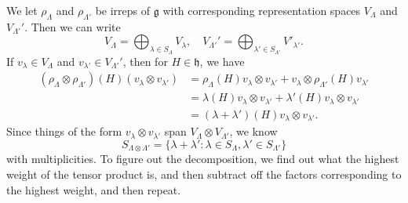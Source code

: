 \documentclass[a4paper]{article}
\begin{document}
We let $\rho_\Lambda$ and $\rho_{\Lambda'}$ be irreps of $\mathfrak{g}$ with corresponding representation spaces $V_\Lambda$ and $V_{\Lambda'}'$. Then we can write
\[
  V_\Lambda = \bigoplus_{\lambda \in S_\Lambda} V_\lambda,\quad V_{\Lambda'}' = \bigoplus_{\lambda' \in S_{\Lambda'}} V'_{\lambda'}.
\]
If $v_\lambda \in V_\Lambda$ and $v_{\lambda'} \in V_{\Lambda'}'$, then for $H \in \mathfrak{h}$, we have
\begin{align*}
  (\rho_\Lambda \otimes \rho_{\Lambda'})(H)(v_\lambda \otimes v_{\lambda'}) &= \rho_\Lambda(H)v_\lambda \otimes v_{\lambda'} + v_\lambda \otimes \rho_{\Lambda'}(H) v_{\lambda'}\\
  &= \lambda(H) v_\lambda \otimes v_{\lambda'} + \lambda'(H) v_\lambda \otimes v_{\lambda'}\\
  &= (\lambda + \lambda')(H) v_\lambda \otimes v_{\lambda'}.
\end{align*}
Since things of the form $v_\lambda \otimes v_{\lambda'}$ span $V_\Lambda \otimes V_{\Lambda'}$, we know
\[
  S_{\Lambda \otimes \Lambda'} = \{\lambda + \lambda': \lambda \in S_\Lambda, \lambda' \in S_{\Lambda'}\}
\]
with multiplicities. To figure out the decomposition, we find out what the highest weight of the tensor product is, and then subtract off the factors corresponding to the highest weight, and then repeat.
\end{document}
